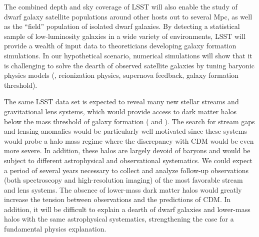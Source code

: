 The combined depth and sky coverage of LSST will also enable the study of dwarf galaxy satellite populations around other hosts out to several Mpc, as well as the ``field'' population of isolated dwarf galaxies.
By detecting a statistical sample of low-luminosity galaxies in a wide variety of environments, LSST will provide a wealth of input data to theoreticians developing galaxy formation simulations.
In our hypothetical scenario, numerical simulations will show that it is challenging to solve the dearth of observed satellite galaxies by tuning baryonic physics models (\eg, reionization physics, supernova feedback, galaxy formation threshold).

The same LSST data set is expected to reveal many new stellar streams and gravitational lens systems, which would provide access to dark matter halos below the mass threshold of galaxy formation ( and ).
The search for stream gaps and lensing anomalies would be particularly well motivated since these systems would probe a halo mass regime where the discrepancy with CDM would be even more severe.
In addition, these halos are largely devoid of baryons and would be subject to different astrophysical and observational systematics.
We could expect a period of several years necessary to collect and analyze follow-up observations (both spectroscopy and high-resolution imaging) of the most favorable stream and lens systems.
The absence of lower-mass dark matter halos would greatly increase the tension between observations and the predictions of CDM.
In addition, it will be difficult to explain a dearth of dwarf galaxies and lower-mass halos with the same astrophysical systematics, strengthening the case for a fundamental physics explanation.


